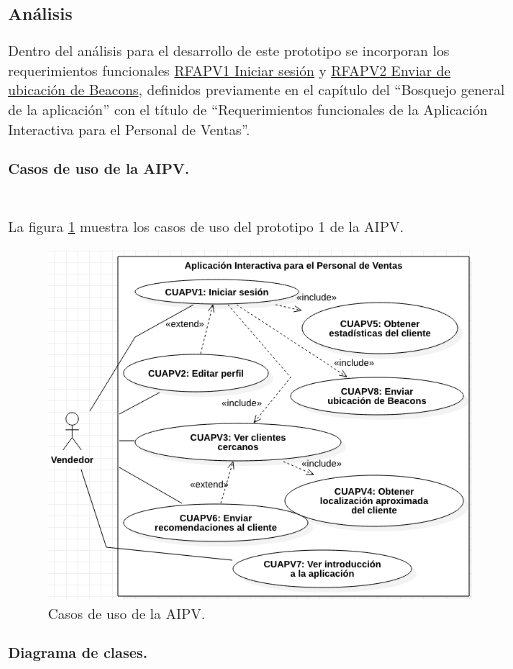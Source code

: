 \subsubsection{Análisis}

Dentro del análisis para el desarrollo de este prototipo se incorporan los requerimientos funcionales \hyperlink{RFAPV}{RFAPV1 Iniciar sesión} y \hyperlink{RFAPV}{RFAPV2 Enviar de ubicación de Beacons}, definidos previamente en el capítulo del ``Bosquejo general de la aplicación''  con el título de ``Requerimientos funcionales de la Aplicación Interactiva para el Personal de Ventas''. \\ \par

\paragraph{Casos de uso de la AIPV.} ~\\

La figura \ref{casos-uso-AIPV1} muestra los casos de uso del prototipo 1 de la AIPV.

\FloatBarrier
\begin{figure}[htbp!]
		\centering
			\includegraphics[width=.9 \textwidth]{imagenes/adrian/vendedor/prototipo1/casos_de_uso}
		\caption{Casos de uso de la AIPV.}
		\label{casos-uso-AIPV1}
\end{figure}
\FloatBarrier

\paragraph{Diagrama de clases.} ~\\

